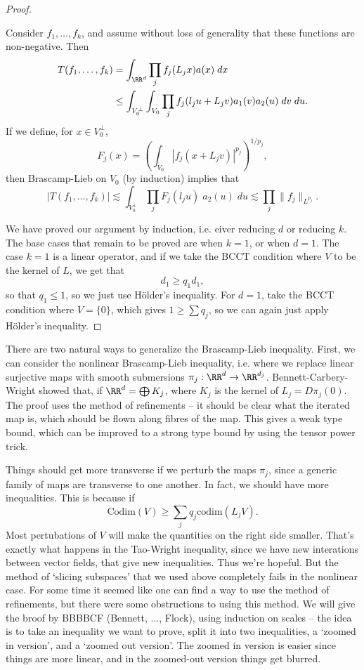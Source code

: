 \begin{proof}
\begin{itemize}
        Consider $f_1,\dots,f_k$, and assume without loss of generality that these functions are non-negative. Then
        \begin{align*}
            T(f_1,\dots,f_k) &= \int_{\RR^d} \prod_j f_j(L_j x) a(x)\; dx\\
            &\leq \int_{V_0^\perp} \int_{V_0} \prod_j f_j(l_j u + L_j v) a_1(v) a_2(u)\; dv\; du.
        \end{align*}
        If we define, for $x \in V_0^\perp$,
        \[ F_j(x) = \left( \int_{V_0} |f_j(x + L_j v)|^{p_j} \right)^{1/p_j}, \]
        then Brascamp-Lieb on $V_0$ (by induction) implies that
        \[ |T(f_1,\dots,f_k)| \lesssim \int_{V_0^\perp} \prod_j F_j(l_j u)\; a_2(u)\; du \lesssim \prod_j \| f_j \|_{L^{p_j}}. \]
    \end{itemize}
    We have proved our argument by induction, i.e. eiver reducing $d$ or reducing $k$. The base cases that remain to be proved are when $k = 1$, or when $d = 1$. The case $k = 1$ is a linear operator, and if we take the BCCT condition where $V$ to be the kernel of $L$, we get that
    \[ d_1 \geq q_1 d_1, \]
    so that $q_1 \leq 1$, so we just use H\"{o}lder's inequality. For $d = 1$, take the BCCT condition where $V = \{ 0 \}$, which gives $1 \geq \sum q_j$, so we can again just apply H\"{o}lder's inequality.
\end{proof}

There are two natural ways to generalize the Brascamp-Lieb inequality. First, we can consider the nonlinear Brascamp-Lieb inequality, i.e. where we replace linear surjective maps with smooth submersions $\pi_j: \RR^d \to \RR^{d_j}$. Bennett-Carbery-Wright showed that, if $\RR^d = \bigoplus K_j$, where $K_j$ is the kernel of $L_j = D \pi_j(0)$. The proof uses the method of refinements -- it should be clear what the iterated map is, which should be flown along fibres of the map. This gives a weak type bound, which can be improved to a strong type bound by using the tensor power trick.

Things should get more transverse if we perturb the maps $\pi_j$, since a generic family of maps are transverse to one another. In fact, we should have more inequalities. This is because if
%
\[ \text{Codim}(V) \geq \sum_j q_j \text{codim}(L_j V). \]
%
Most pertubations of $V$ will make the quantities on the right side smaller. That's exactly what happens in the Tao-Wright inequality, since we have new interations between vector fields, that give new inequalities. Thus we're hopeful. But the method of `slicing subspaces' that we used above completely fails in the nonlinear case. For some time it seemed like one can find a way to use the method of refinements, but there were some obstructions to using this method. We will give the broof by BBBBCF (Bennett, ..., Flock), using induction on scales -- the idea is to take an inequality we want to prove, split it into two inequalities, a `zoomed in version', and a `zoomed out version'. The zoomed in version is easier since things are more linear, and in the zoomed-out version things get blurred.

